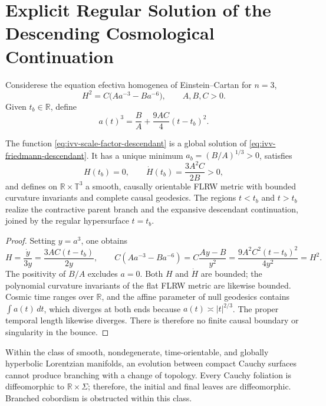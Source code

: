 
\section{Explicit Regular Solution of the Descending Cosmological Continuation}
\label{sec:ivv-descendant-explicit}

Considerese the equation efectiva homogenea of Einstein--Cartan for
\(n=3\),
\begin{equation}
 H^2=C\bigl(Aa^{-3}-Ba^{-6}\bigr),
 \qquad A,B,C>0.
 \label{eq:ivv-friedmann-descendant}
\end{equation}
Given \(t_b\in\mathbb R\), define
\begin{equation}
 a(t)^3=\frac BA+\frac{9AC}{4}(t-t_b)^2.
 \label{eq:ivv-scale-factor-descendant}
\end{equation}

\begin{theorem}
\label{thm:ivv-descendant-existence}
The function \eqref{eq:ivv-scale-factor-descendant} is a global solution of
\eqref{eq:ivv-friedmann-descendant}. It has a unique minimum
\(a_b=(B/A)^{1/3}>0\), satisfies
\[
 H(t_b)=0,
 \qquad
 \dot H(t_b)=\frac{3A^2C}{2B}>0,
\]
and defines on \(\mathbb R\times\mathbb T^3\) a smooth,
causally orientable FLRW metric with bounded curvature invariants and complete
causal geodesics. The regions \(t<t_b\) and \(t>t_b\) realize the contractive
parent branch and the expansive descendant continuation, joined by the
regular hypersurface \(t=t_b\).
\end{theorem}

\begin{proof}
Setting \(y=a^3\), one obtains
\[
 H=\frac{\dot y}{3y}=\frac{3AC(t-t_b)}{2y},
 \qquad
 C(Aa^{-3}-Ba^{-6})
 =C\frac{Ay-B}{y^2}
 =\frac{9A^2C^2(t-t_b)^2}{4y^2}=H^2.
\]
The positivity of \(B/A\) excludes \(a=0\). Both \(H\) and \(\dot H\)
are bounded; the polynomial curvature invariants of the flat FLRW metric
are likewise bounded. Cosmic time ranges over \(\mathbb R\), and the affine
parameter of null geodesics contains \(\int a(t)\,dt\), which diverges at both
ends because \(a(t)\asymp |t|^{2/3}\). The proper temporal length likewise
diverges. There is therefore no finite causal boundary or singularity in the
bounce.
\end{proof}

\begin{theorem}
\label{thm:ivv-cobordism-obstruction}
Within the class of smooth, nondegenerate, time-orientable, and globally
hyperbolic Lorentzian manifolds, an evolution between compact Cauchy
surfaces cannot produce branching with a change of topology. Every Cauchy
foliation is diffeomorphic to \(\mathbb R\times\Sigma\); therefore,
the initial and final leaves are diffeomorphic. Branched cobordism is
obstructed within this class.
\end{theorem}

